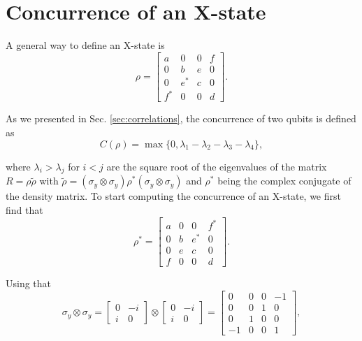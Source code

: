 
\section{Concurrence of an X-state}
\label{apx:concurrence}

A general way to define an X-state is
\begin{equation}
    \rho = 
    \begin{bmatrix}
        a & 0 & 0 & f\\
        0 & b & e & 0\\
        0 & e^* & c & 0\\
        f^* & 0 & 0 & d
    \end{bmatrix}.
\end{equation}

\noindent As we presented in Sec. \ref{sec:correlations}, the concurrence of two qubits is defined as
\begin{equation}
    C({\rho}) = \max\{ 0, \lambda_1 - \lambda_2 - \lambda_3 - \lambda_4 \},
\end{equation}

\noindent where $\lambda_i > \lambda_j$ for $i<j$ are the square root of the eigenvalues of the matrix $R = \rho \tilde{\rho}$ with $\tilde{\rho} = (\sigma_y \otimes \sigma_y) \rho^* (\sigma_y \otimes \sigma_y)$ and $\rho^*$ being the complex conjugate of the density matrix. To start computing the concurrence of an X-state, we first find that
\begin{equation}
    \rho^* = 
    \begin{bmatrix}
        a & 0 & 0 & f^*\\
        0 & b & e^* & 0\\
        0 & e & c & 0\\
        f & 0 & 0 & d
    \end{bmatrix}.
\end{equation}

\noindent Using that
\begin{equation}
    \sigma_y \otimes \sigma_y = 
    \begin{bmatrix}
        0 & -i\\
        i & 0
    \end{bmatrix} \otimes
    \begin{bmatrix}
        0 & -i\\
        i & 0
    \end{bmatrix} =
    \begin{bmatrix}
        0 & 0 & 0 & -1\\
        0 & 0 & 1 & 0\\
        0 & 1 & 0 & 0\\
        -1 & 0 & 0 & 1
    \end{bmatrix},
\end{equation}

